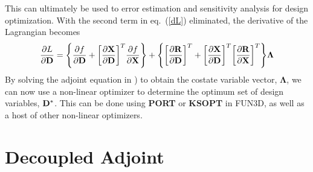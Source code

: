 This can ultimately be used to error estimation and sensitivity analysis for
design optimization.  With the second term in eq.~(\ref{dL}) eliminated, the
derivative of the Lagrangian becomes
\begin{equation}
  \frac{\partial L}{\partial \mathbf D}=
  \Bigg\{\frac{\partial f}{\partial \mathbf D}+\bigg[\frac{\partial \mathbf X}{\partial
  \mathbf D}\bigg]^T \frac{\partial f}{\partial \mathbf X}\Bigg\}
  +\Bigg\{\bigg[\frac{\partial \mathbf R}{\partial \mathbf D}\bigg]^T
  +\bigg[\frac{\partial \mathbf X}{\partial \mathbf D}\bigg]^T\bigg[\frac{\partial
  \mathbf R}{\partial \mathbf X}\bigg]^T\Bigg\}\mathbf{\Lambda}
  \label{obj_function}
\end{equation}
By solving the adjoint equation in ) to obtain the costate
variable vector, $\mathbf{\Lambda}$, we can now use a non-linear optimizer to
determine the optimum set of design variables, $\mathbf D^*$. This can be done using
{\bf PORT} or {\bf KSOPT} in FUN3D, as well as a host of other non-linear
optimizers.

\section{Decoupled Adjoint}

